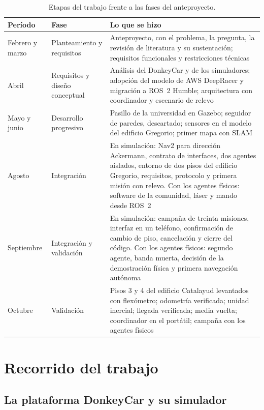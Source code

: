 \begin{table}[H]
  \centering
  \caption{Etapas del trabajo frente a las fases del anteproyecto.}
  \label{tab:etapas}
  \footnotesize
  \begin{tabular}{@{}p{}p{}p{}@{}}
    \toprule
    \textbf{Período} & \textbf{Fase} & \textbf{Lo que se hizo} \\ \midrule
    Febrero y marzo & Planteamiento y requisitos & Anteproyecto, con el problema, la pregunta, la revisión de literatura y su sustentación; requisitos funcionales y restricciones técnicas \\ \addlinespace
    Abril & Requisitos y diseño conceptual & Análisis del DonkeyCar y de los simuladores; adopción del modelo de AWS DeepRacer y migración a ROS~2 Humble; arquitectura con coordinador y escenario de relevo \\ \addlinespace
    Mayo y junio & Desarrollo progresivo & Pasillo de la universidad en Gazebo; seguidor de paredes, descartado; sensores en el modelo del edificio Gregorio; primer mapa con SLAM \\ \addlinespace
    Agosto & Integración & En simulación: Nav2 para dirección Ackermann, contrato de interfaces, dos agentes aislados, entorno de dos pisos del edificio Gregorio, requisitos, protocolo y primera misión con relevo. Con los agentes físicos: software de la comunidad, láser y mando desde ROS~2 \\ \addlinespace
    Septiembre & Integración y validación & En simulación: campaña de treinta misiones, interfaz en un teléfono, confirmación de cambio de piso, cancelación y cierre del código. Con los agentes físicos: segundo agente, banda muerta, decisión de la demostración física y primera navegación autónoma \\ \addlinespace
    Octubre & Validación & Pisos 3 y 4 del edificio Catalayud levantados con flexómetro; odometría verificada; unidad inercial; llegada verificada; media vuelta; coordinador en el portátil; campaña con los agentes físicos \\ \bottomrule
  \end{tabular}
\end{table}

\section{Recorrido del trabajo}
\label{sec:recorrido}

\subsection{La plataforma DonkeyCar y su simulador}
\label{sec:donkeycar}

